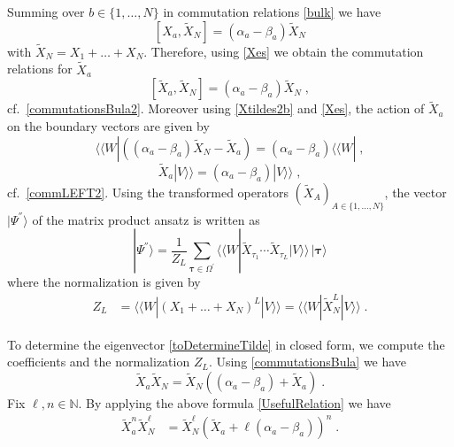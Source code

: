 \documentclass[10pt]{article}
\numberwithin{equation}{section}
\numberwithin{equation}{subsection}
\newcommand{\Xt}{\widetilde{X}}
\newcommand{\co}{\;,}
\newcommand{\dt}{\;.}
\newcommand{\fra}[1]{\textcolor[rgb]{0,0,1}{#1}}
\begin{document}
Summing over $b\in \{1,\ldots,N\}$ in commutation relations \eqref{bulk} we have
\begin{equation} 
	\left[X_{a},\Xt_{N}\right]=(\alpha_{a}-\beta_{a})\Xt_{N}
\end{equation}
with $\widetilde{X}_{N}= {X}_{1}+\ldots+ {X}_{N}$. 
Therefore, using \eqref{Xes}
we obtain the commutation relations for $\Xt_{a}$ 
\begin{equation}\label{commutationsBula}
	\left[\Xt_{a},\Xt_{N}\right]=(\alpha_{a}-\beta_{a})\Xt_{N}\co
\end{equation} 
cf.~\eqref{commutationsBula2}.
Moreover using \eqref{Xtildes2b} and \eqref{Xes}, the action of $\Xt_{a}$ on the boundary vectors are given by 
\begin{equation}\label{commLEFT}
	 \langle \langle W|  \left((\alpha_{a}-\beta_{a})\Xt_{N}-\Xt_{a}\right)=(\alpha_{a}-\beta_{a}) \langle \langle W|  
	\co
\end{equation}
\begin{equation}\label{commRIGHT}
	\Xt_{a}  |V\rangle\rangle = (\alpha_{a}-\beta_{a}) |V\rangle\rangle 
	\co
\end{equation}  
cf.~\eqref{commLEFT2}.
Using the transformed operators \fra{$(\widetilde{X}_{A})_{A\in\{1,\ldots,N\}}$}, the vector $|\Psi^{''}\rangle$ of the matrix product ansatz is written as
\begin{equation}\label{toDetermineTilde}
	|\Psi^{''}\rangle = \frac{1}{Z_{L}}\sum_{\bm{\tau}\in \Omega^{'}} \langle \langle W| \widetilde{X}_{\tau_{1}}\cdots \widetilde{X}_{\tau_{L}}
	|V\rangle\rangle \,|\bm{\tau}\rangle
\end{equation} 
where
the normalization is given by 
\begin{align}
		Z_{L}&= \langle \langle W|  (X_{1}+\ldots+X_{N})^{L} |V\rangle\rangle = \langle \langle W|  \widetilde{X}_{N}^{L} |V\rangle\rangle \dt
\end{align}

To determine the eigenvector \eqref{toDetermineTilde} in closed form, we compute the coefficients and the normalization $Z_{L}$. Using \eqref{commutationsBula} we have
\begin{equation}\label{UsefulRelation}
	\widetilde{X}_{a}\widetilde{X}_{N}=\widetilde{X}_{N}\left((\alpha_{a}-\beta_{a})+\widetilde{X}_{a}\right)\dt
\end{equation}
Fix  $ \ell,n\in \mathbb{N}$. By applying the above formula \eqref{UsefulRelation} we have
\begin{align}\label{usefulRelaton-many}
	\widetilde{X}_{a}^{n}\widetilde{X}_{N}^{\ell}&=
	\widetilde{X}_{N}^{\ell}\left(\widetilde{X}_{a}+\ell(\alpha_{a}-\beta_{a})\right)^{n}\dt
\end{align}
\end{document}
